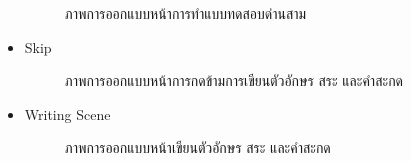 \documentclass[12pt,oneside,openright,a4paper]{cpe-thai-project}
\begin{document}
\begin{itemize}
\begin{figure}[!ht]
    \caption{ภาพการออกแบบหน้าการทำแบบทดสอบด่านสาม}\label{fig:system}
  \end{figure}
  \item Skip
  \begin{figure}[!ht]\centering
    \setlength{\fboxrule}{0.2mm} %
    \setlength{\fboxsep}{1cm}
    \caption{ภาพการออกแบบหน้าการกดข้ามการเขียนตัวอักษร สระ และคำสะกด}\label{fig:system}
  \end{figure}
  \newpage
  \item Writing Scene
  \begin{figure}[!ht]\centering
    \setlength{\fboxrule}{0.2mm} %
    \setlength{\fboxsep}{1cm}
    \caption{ภาพการออกแบบหน้าเขียนตัวอักษร สระ และคำสะกด}\label{fig:system}
  \end{figure}
  \begin{figure}[!ht]\centering
    \setlength{\fboxrule}{0.2mm} %
    \setlength{\fboxsep}{1cm}

\end{figure}
\end{itemize}
\end{document}
